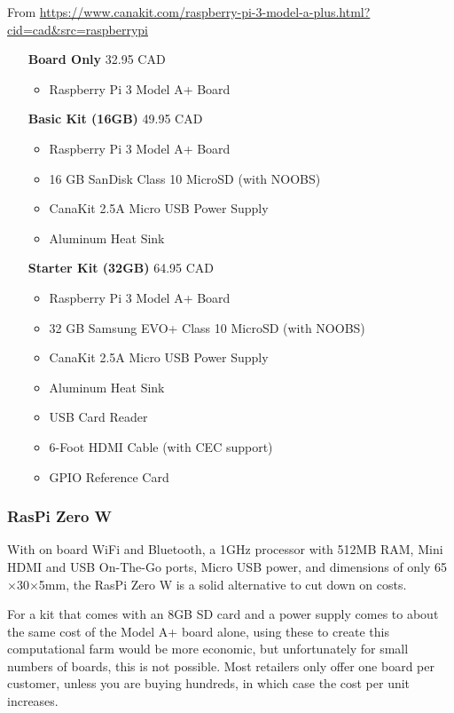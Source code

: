 \documentclass{report}
\begin{document}
From \url{https://www.canakit.com/raspberry-pi-3-model-a-plus.html?cid=cad&src=raspberrypi}
\begin{itemize}
	\centering
	\item[{\bf Board Only}] 32.95 CAD
	\begin{itemize}
		\item Raspberry Pi 3 Model A+ Board
	\end{itemize}
	\item[{\bf Basic Kit (16GB)}] 49.95 CAD
	\begin{itemize}
		\item Raspberry Pi 3 Model A+ Board
		\item 16 GB SanDisk Class 10 MicroSD (with NOOBS)
		\item CanaKit 2.5A Micro USB Power Supply
		\item Aluminum Heat Sink
	\end{itemize}
	\item[{\bf Starter Kit (32GB)}] 64.95 CAD
	\begin{itemize}
		\item Raspberry Pi 3 Model A+ Board
		\item 32 GB Samsung EVO+ Class 10 MicroSD (with NOOBS)
		\item CanaKit 2.5A Micro USB Power Supply
		\item Aluminum Heat Sink
		\item USB Card Reader
		\item 6-Foot HDMI Cable (with CEC support)
		\item GPIO Reference Card
	\end{itemize}
\end{itemize}

\subsubsection{RasPi Zero W}

With on board WiFi and Bluetooth, a 1GHz processor with 512MB RAM, Mini HDMI and USB On-The-Go ports, Micro USB power, and dimensions of only 65$\times$30$\times$5mm, the RasPi Zero W is a solid alternative to cut down on costs. 

For a kit that comes with an 8GB SD card and a power supply comes to about the same cost of the Model A+ board alone, using these to create this computational farm would be more economic, but unfortunately for small numbers of boards, this is not possible. Most retailers only offer one board per customer, unless you are buying hundreds, in which case the cost per unit increases. 
\end{document}
